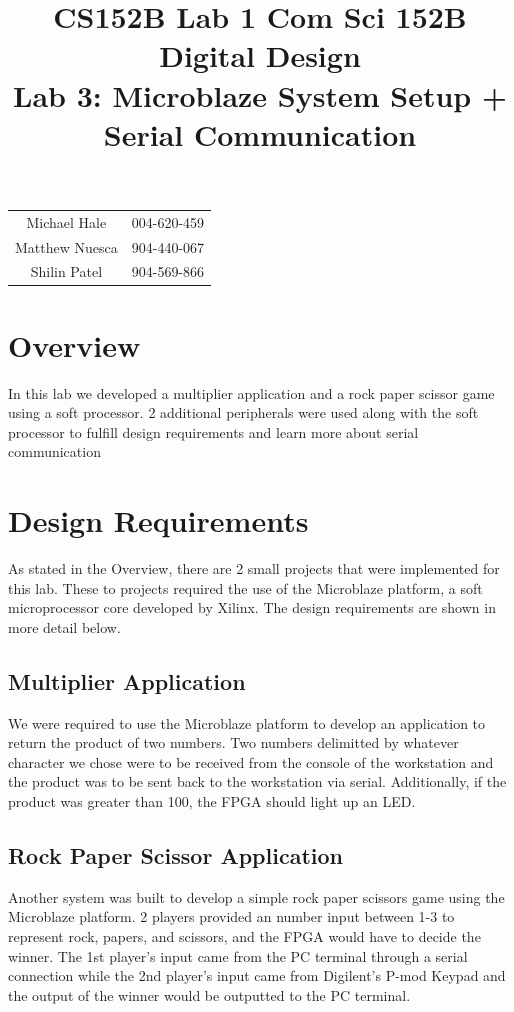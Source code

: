 \documentclass[11pt]{article}
\title{CS152B Lab 1}
\begin{document}
	
\title{\vspace{-0.5in} Com Sci 152B Digital Design \\
	Lab 3: Microblaze System Setup + Serial Communication }
\date{}
\maketitle
\vspace{-0.75in}
\begin{center}
	\begin{tabular}{cc}
		Michael Hale & 004-620-459 \\ 
		Matthew Nuesca & 904-440-067 \\ 
		Shilin Patel & 904-569-866 \\ 
	\end{tabular}
\end{center}

\section{Overview}
In this lab we developed a multiplier application and a rock paper scissor game using a soft processor. 2 additional peripherals were used along with the soft processor to fulfill design requirements and learn more about serial communication

\section{Design Requirements}
As stated in the Overview, there are 2 small projects that were implemented for this lab. These to projects required the use of the Microblaze platform, a soft microprocessor core developed by Xilinx. The design requirements are shown in more detail below.

\subsection{Multiplier Application}
We were required to use the Microblaze platform to develop an application to return the product of two numbers. Two numbers delimitted by whatever character we chose were to be received from the console of the workstation and the product was to be sent back to the workstation via serial. Additionally, if the product was greater than 100, the FPGA should light up an LED.

\subsection{Rock Paper Scissor Application}
Another system was built to develop a simple rock paper scissors game using the Microblaze platform. 2 players provided an number input between 1-3 to represent rock, papers, and scissors, and the FPGA would have to decide the winner. The 1st player's input came from the PC terminal through a serial connection while the 2nd player's input came from Digilent's P-mod Keypad and the output of the winner would be outputted to the PC terminal. 
\end{document}

